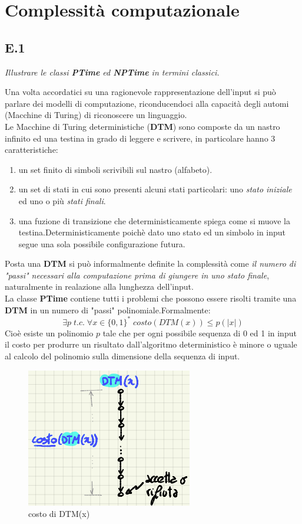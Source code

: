 \documentclass[a4paper]{article}
\begin{document}
\section{Complessità computazionale}
\subsection{E.1}
\emph{Illustrare le classi \textbf{PTime} ed \textbf{NPTime} in termini classici.}


Una volta accordatici su una ragionevole rappresentazione dell'input si può parlare dei modelli di computazione, riconducendoci alla capacità degli automi (Macchine di Turing) di riconoscere un linguaggio.\\
Le Macchine di Turing deterministiche (\textbf{DTM}) sono composte da un nastro infinito ed una testina in grado di leggere e scrivere, in particolare hanno 3 caratteristiche:
\begin{enumerate}
	\item un set finito di simboli scrivibili sul nastro (alfabeto).
	\item un set di stati in cui sono presenti alcuni stati particolari: uno \textit{stato iniziale} ed uno o più \textit{stati finali}.
	\item una fuzione di transizione che deterministicamente spiega come si muove la testina.Deterministicamente poichè dato uno stato ed un simbolo in input segue una sola possibile configurazione futura.
\end{enumerate}
Posta una \textbf{DTM} si può informalmente definite la complessità come \textit{il numero di "passi" necessari alla computazione prima di giungere in uno stato finale}, naturalmente in realazione alla lunghezza dell'input.\\
La classe \textbf{PTime} contiene tutti i problemi che possono essere risolti tramite una \textbf{DTM} in un numero di "passi" polinomiale.Formalmente: $$\exists p \; t.c. \; \forall x \in \{0,1\}^* \; costo(DTM(x)) \leq p(\lvert x \rvert)$$
Cioè esiste un polinomio $p$ tale che per ogni possibile sequenza di 0 ed 1 in input il costo per produrre un risultato dall'algoritmo deterministico è minore o uguale al calcolo del polinomio sulla dimensione della sequenza di input.
\begin{figure}[!ht]
\centering
\includegraphics[scale = 0.5]{./img/E1_DTM.png}
\caption{costo di DTM(x)} \label{FIG:E1_DTM}
\end{figure}\\
\end{document}
